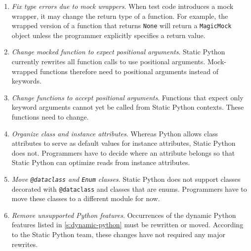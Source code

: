 \documentclass[english,cleveref,submission]{programming}
\newcommand{\SP}{Static Python}
\newcommand{\code}[1]{\texttt{#1}}
\newcommand{\ipara}[1]{\emph{#1}\/.}
\begin{document}
\begin{enumerate}
  \item
    \ipara{Fix type errors due to mock wrappers}
    When test code introduces a mock wrapper, it may change the return type of
    a function.
    For example, the wrapped version of a function that returns \code{None}
    will return a \code{MagicMock} object unless the programmer explicitly
    specifies a return value.

  \item
    \ipara{Change mocked function to expect positional arguments}
    \SP{} currently rewrites all function calls to use positional arguments.
    Mock-wrapped functions therefore need to positional arguments instead of keywords.

  \item
    \ipara{Change functions to accept positional arguments}
    Functions that expect only keyword arguments cannot yet be called from \SP{} contexts.
    These functions need to change.

  \item
    \ipara{Organize class and instance attributes}
    Whereas Python allows class attributes to serve as default values for instance attributes,
    \SP{} does not.
    Programmers have to decide where an attribute belongs so that \SP{} can optimize
    reads from instance attributes.

  \item
    \ipara{Move \code{@dataclass} and \code{Enum} classes}
    \SP{} does not support classes decorated with \code{@dataclass}
    and classes that are enums.
    Programmers have to move these classes to a different module for now.

  \item
    \ipara{Remove unsupported Python features}
    Occurrences of the dynamic Python features listed in \cref{s:dynamic-python} must be rewritten or moved.
    According to the \SP{} team, these changes have not required any major rewrites.

\end{enumerate}
\end{document}
